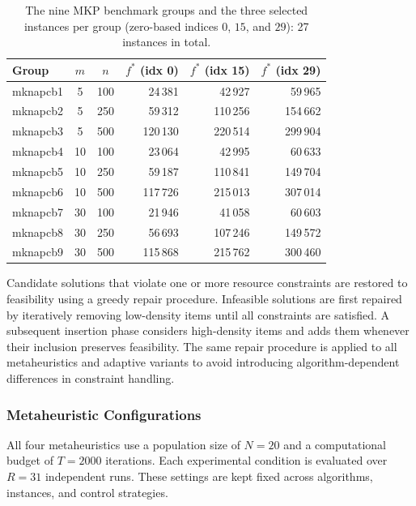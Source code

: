 \documentclass[journal,article,submit,moreauthors]{Definitions/mdpi}
\begin{document}
\begin{table}[htbp]
\centering
\small
\caption{The nine MKP benchmark groups and the three selected instances per
group (zero-based indices $0$, $15$, and $29$): 27 instances in total.}
\label{tab:instances}
\begin{tabular}{@{}lccrrr@{}}
\toprule
\textbf{Group} & \textbf{$m$} & \textbf{$n$} &
\textbf{$f^*$ (idx 0)} & \textbf{$f^*$ (idx 15)} & \textbf{$f^*$ (idx 29)} \\
\midrule
mknapcb1 & 5 & 100 & 24\,381 & 42\,927 & 59\,965 \\
mknapcb2 & 5 & 250 & 59\,312 & 110\,256 & 154\,662 \\
mknapcb3 & 5 & 500 & 120\,130 & 220\,514 & 299\,904 \\
mknapcb4 & 10 & 100 & 23\,064 & 42\,995 & 60\,633 \\
mknapcb5 & 10 & 250 & 59\,187 & 110\,841 & 149\,704 \\
mknapcb6 & 10 & 500 & 117\,726 & 215\,013 & 307\,014 \\
mknapcb7 & 30 & 100 & 21\,946 & 41\,058 & 60\,603 \\
mknapcb8 & 30 & 250 & 56\,693 & 107\,246 & 149\,572 \\
mknapcb9 & 30 & 500 & 115\,868 & 215\,762 & 300\,460 \\
\bottomrule
\end{tabular}
\end{table}

Candidate solutions that violate one or more resource constraints are
restored to feasibility using a greedy repair procedure. Infeasible
solutions are first repaired by iteratively removing low-density items until
all constraints are satisfied. A subsequent insertion phase considers
high-density items and adds them whenever their inclusion preserves
feasibility. The same repair procedure is applied to all metaheuristics and
adaptive variants to avoid introducing algorithm-dependent differences in
constraint handling.


\subsubsection{Metaheuristic Configurations}
\label{sec:mh_config}

All four metaheuristics use a population size of $N=20$ and a computational
budget of $T=2000$ iterations. Each experimental condition is evaluated over
$R=31$ independent runs. These settings are kept fixed across algorithms,
instances, and control strategies.
\end{document}
